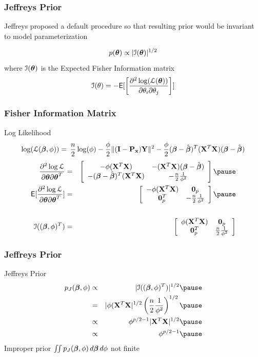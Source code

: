 \documentclass[handout]{beamer}
\begin{document}
\begin{frame}
  \frametitle{Jeffreys Prior}

Jeffreys proposed a default  procedure so that resulting prior
would be invariant to model parameterization  \pause

$$p(\boldsymbol{\theta}) \propto |{\cal{I}}(\boldsymbol{\theta})|^{1/2}$$
\pause
where ${\cal{I}}(\boldsymbol{\theta})$ is the  Expected Fisher Information matrix
\pause
$$
{\cal{I}}(\theta) = - \textsf{E}[ \left[ \frac{\partial^2 \log({\cal{L}}(\boldsymbol{\theta}))}{\partial
  \theta_i \partial \theta_j} \right] ]
$$
\end{frame}
\begin{frame}
  \frametitle{Fisher Information Matrix}
Log Likelihood
$$
    \log({\cal{L}}(\boldsymbol{\beta}, \phi))  =  \, \frac{n}{2} \log(\phi)  - \frac{\phi}{2}
     \| (\mathbf{I} - \mathbf{P}_{\mathbf{x}}) \mathbf{Y}\|^2
 - \frac{\phi}{2}(\boldsymbol{\beta} - \hat{\boldsymbol{\beta}})^T(\mathbf{X}^T\mathbf{X})(\boldsymbol{\beta} - \hat{\boldsymbol{\beta}})
$$ \pause
  \begin{eqnarray*}
\frac{\partial^2 \log \cL} { \partial \tb \partial \tb^T} & = &
\left[
  \begin{array}{cc}
    -\phi (\X^T\X) & -(\X^T\X) (\b - \bhat) \\
  - (\b - \bhat)^T (\X^T\X) & -\frac{n}{2} \frac{1}{\phi^2} \\
  \end{array}
\right] \pause \\
\E[\frac{\partial^2 \log \cL} { \partial \tb \partial \tb^T}] & = &
\left[
  \begin{array}{cc}
    -\phi (\X^T\X) & \zero_p \\
  \zero_p^T & -\frac{n}{2} \frac{1}{\phi^2} \\
  \end{array}
\right] \pause \\
& & \\
\cI((\b, \phi)^T) & = & \left[
  \begin{array}{cc}
    \phi (\X^T\X) & \zero_p \\
  \zero_p^T & \frac{n}{2} \frac{1}{\phi^2}
  \end{array}
\right]
  \end{eqnarray*}
\end{frame}
\begin{frame}
  \frametitle{Jeffreys Prior}
  Jeffreys Prior
  \begin{eqnarray*}
  p_J(\b, \phi)  & \propto & |\cI((\b, \phi)^T) |^{1/2}   \pause \\
               & = & |\phi (\X^T\X|^{1/2} \left(\frac{n}{2}
                 \frac{1}{\phi^2} \right)^{1/2} \pause \\
  & \propto  &  \phi^{p/2 - 1} |\X^T\X|^{1/2} \pause \\
  & \propto & \phi^{p/2 - 1}  \pause
  \end{eqnarray*}
  Improper prior   $\iint p_J(\boldsymbol{\beta}, \phi) \, d\boldsymbol{\beta} \, d\phi $ not finite

\end{frame}
\end{document}
